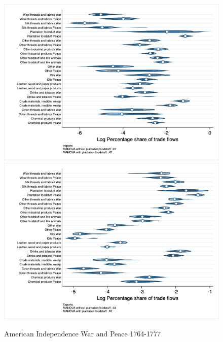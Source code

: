 \documentclass[12pt,a4paper,notitlepage,english]{article}
\begin{document}
\begin{figure}
\centering
\caption{American Independence War and Peace 1764-1777}
\label{peace1764_1777_indep_nat_distr_sitc}
\includegraphics[scale=.4]{peace1764_1777_indep_nat_distr_Isitc}
\includegraphics[scale=.4]{peace1764_1777_indep_nat_distr_Xsitc}
\end{figure}
\end{document}
